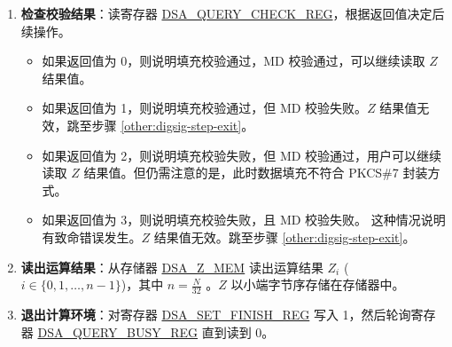 \documentclass[main\_\_CN.tex]{subfiles}
\begin{document}
\begin{enumerate}
    \item {\bfseries 检查校验结果}：读寄存器 \hyperref[regdesc:DSAQUERYCHECKREG]{DSA\_QUERY\_CHECK\_REG}，根据返回值决定后续操作。

    \begin{itemize}

        \item 如果返回值为 0，则说明填充校验通过，MD 校验通过，可以继续读取 \begin{math}Z\end{math} 结果值。

        \item 如果返回值为 1，则说明填充校验通过，但 MD 校验失败。\begin{math}Z\end{math} 结果值无效，跳至步骤 \ref{other:digsig-step-exit}。

        \item 如果返回值为 2，则说明填充校验失败，但 MD 校验通过，用户可以继续读取 \begin{math}Z\end{math} 结果值。但仍需注意的是，此时数据填充不符合 PKCS\#7 封装方式。

        \item 如果返回值为 3，则说明填充校验失败，且 MD 校验失败。 这种情况说明有致命错误发生。\begin{math}Z\end{math} 结果值无效。跳至步骤 \ref{other:digsig-step-exit}。

    \end{itemize}

    \item {\bfseries 读出运算结果}：从存储器 \hyperref[DSAZMEM]{DSA\_Z\_MEM} 读出运算结果 \begin{math}Z_{i}\end{math} (\begin{math}i \in \{0, 1, \dots, n-1\}\end{math})，其中 \begin{math} n = \frac{N}{32} \end{math} 。\begin{math}Z\end{math} 以小端字节序存储在存储器中。

    \item {\bfseries 退出计算环境\label{other:digsig-step-exit}}：对寄存器 \hyperref[regdesc:DSASETFINISHREG]{DSA\_SET\_FINISH\_REG} 写入 1，然后轮询寄存器 \hyperref[regdesc:DSAQUERYBUSYREG]{DSA\_QUERY\_BUSY\_REG} 直到读到 0。

\end{enumerate}
\end{document}
